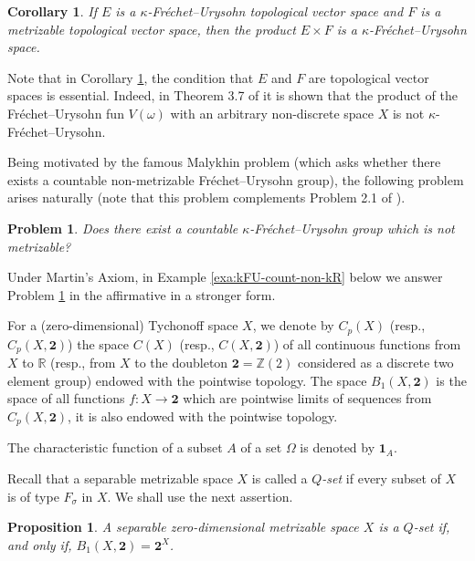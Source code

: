 \documentclass[preprint,11pt]{elsarticle}
\newtheorem{corollary}[theorem]{Corollary}
\newtheorem{proposition}[theorem]{Proposition}
\newtheorem{problem}[theorem]{Problem}
\theoremstyle{definition}
\theoremstyle{remark}
\numberwithin{equation}{section}
\numberwithin{theorem}{section}
\newcommand{\w}{\omega}
\newcommand{\ZZ}{\mathbb{Z}}
\newcommand{\IR}{\mathbb{R}}
\begin{document}
\begin{corollary} \label{c:prod-kFU-metr-tvs}
If $E$ is a $\kappa$-Fr\'{e}chet--Urysohn topological vector space and $F$ is a metrizable topological vector space, then the product $E\times F$ is a $\kappa$-Fr\'{e}chet--Urysohn space.
\end{corollary}
Note that in Corollary \ref{c:prod-kFU-metr-tvs}, the condition that $E$ and $F$ are topological vector spaces is essential. Indeed, in Theorem 3.7 of \cite{GR-compact} it is shown that the product of the Fr\'{e}chet--Urysohn fun $V(\w)$ with an arbitrary non-discrete space $X$ is not $\kappa$-Fr\'{e}chet--Urysohn.

Being motivated by the famous Malykhin problem (which asks whether there exists a countable non-metrizable Fr\'{e}chet--Urysohn group), the following problem arises naturally (note that this problem complements Problem 2.1 of \cite{GR-compact}).
\begin{problem} \label{prob:kFU-not-kR}
Does there exist a countable  $\kappa$-Fr\'{e}chet--Urysohn group which is not metrizable?
\end{problem}
Under Martin's Axiom, in Example \ref{exa:kFU-count-non-kR} below we answer Problem \ref{prob:kFU-not-kR} in the affirmative in a stronger form.

For a (zero-dimensional) Tychonoff space  $X$, we denote by $C_p(X)$ (resp., $C_p(X,\mathbf{2})$) the space $C(X)$ (resp., $C(X,\mathbf{2})$) of all continuous functions from $X$ to $\IR$ (resp., from $X$ to the doubleton $\mathbf{2}=\ZZ(2)$ considered as a discrete two element group) endowed with the pointwise topology. The space $B_1(X,\mathbf{2})$ is the space of all functions $f:X\to \mathbf{2}$ which are pointwise limits of sequences from $C_p(X,\mathbf{2})$, it is also endowed with the pointwise topology.

The characteristic function of a subset $A$ of a set $\Omega$ is denoted by $\mathbf{1}_A$.

Recall that a separable metrizable space $X$ is called a {\em $Q$-set} if every subset of $X$  is of type $F_\sigma$ in $X$. We shall use the next assertion.

\begin{proposition} \label{p:Q-set=Q2-set}
A separable zero-dimensional metrizable space $X$ is  a $Q$-set if, and only if, $B_1(X,\mathbf{2})=\mathbf{2}^X$.
\end{proposition}
\end{document}
